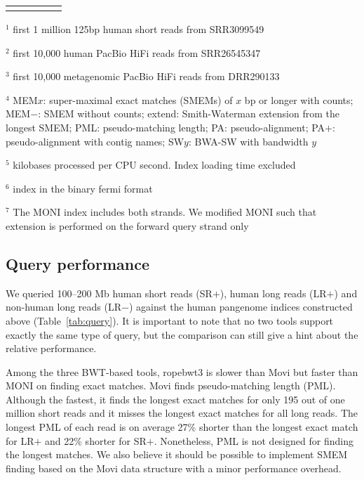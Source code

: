 \documentclass[webpdf,contemporary,large,namedate]{oup-authoring-template}%
\begin{document}
\begin{table}[!tb]
\begin{tabular*}{\columnwidth}{@{\extracolsep\fill}lllrr@{\extracolsep\fill}}
\botrule
\end{tabular*}
\begin{tablenotes}\setlength\itemsep{0.0em}
\item[$^1$] first 1 million 125bp human short reads from SRR3099549
\item[$^2$] first 10,000 human PacBio HiFi reads from SRR26545347
\item[$^3$] first 10,000 metagenomic PacBio HiFi reads from DRR290133
\item[$^4$] MEM$x$: super-maximal exact matches (SMEMs) of $x$ bp or longer with counts;
MEM$-$: SMEM without counts;
extend: Smith-Waterman extension from the longest SMEM;
PML: pseudo-matching length; PA: pseudo-alignment; PA$+$: pseudo-alignment with contig names;
SW$y$: BWA-SW with bandwidth $y$
\item[$^5$] kilobases processed per CPU second. Index loading time excluded
\item[$^6$] index in the binary fermi format
\item[$^7$] The MONI index includes both strands.
We modified MONI such that extension is performed on the forward query strand only
\end{tablenotes}
\end{table}

\subsection{Query performance}

We queried 100--200 Mb human short reads (SR$+$), human long reads (LR$+$) and non-human long reads (LR$-$) against the human pangenome indices constructed above (Table~\ref{tab:query}).
It is important to note that no two tools support exactly the same type of query,
but the comparison can still give a hint about the relative performance.

Among the three BWT-based tools, ropebwt3 is slower than Movi but faster than MONI on finding exact matches.
Movi finds pseudo-matching length (PML).
Although the fastest, it finds the longest exact matches for only 195 out of one million short reads
and it misses the longest exact matches for all long reads.
The longest PML of each read is on average 27\% shorter than the longest exact match for LR$+$ and 22\% shorter for SR$+$.
Nonetheless, PML is not designed for finding the longest matches.
We also believe it should be possible to implement SMEM finding based on the Movi data structure with a minor performance overhead.
\end{document}
